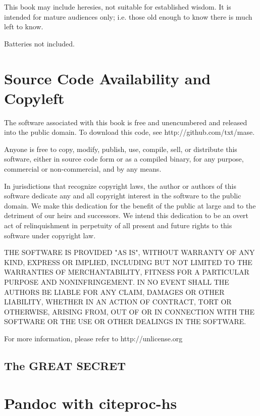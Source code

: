 \documentclass[9pt,twocolumn]{article}
\newcommand{\said}[1]{\citet*{#1}}
\begin{document}
This book may include heresies, not suitable for established wisdom. It is
intended for mature audiences only; i.e.  those
old enough to know there is much left to know. 

Batteries not included.

\section*{Source Code Availability and Copyleft}
The software associated with this book
is free and unencumbered and released into the public domain. To download this code, see http://github.com/txt/mase.

Anyone is free to copy, modify, publish, use, compile, sell, or
distribute this software, either in source code form or as a compiled
binary, for any purpose, commercial or non-commercial, and by any
means.

In jurisdictions that recognize copyright laws, the author or authors
of this software dedicate any and all copyright interest in the
software to the public domain. We make this dedication for the benefit
of the public at large and to the detriment of our heirs and
successors. We intend this dedication to be an overt act of
relinquishment in perpetuity of all present and future rights to this
software under copyright law.

THE SOFTWARE IS PROVIDED "AS IS", WITHOUT WARRANTY OF ANY KIND,
EXPRESS OR IMPLIED, INCLUDING BUT NOT LIMITED TO THE WARRANTIES OF
MERCHANTABILITY, FITNESS FOR A PARTICULAR PURPOSE AND NONINFRINGEMENT.
IN NO EVENT SHALL THE AUTHORS BE LIABLE FOR ANY CLAIM, DAMAGES OR
OTHER LIABILITY, WHETHER IN AN ACTION OF CONTRACT, TORT OR OTHERWISE,
ARISING FROM, OUT OF OR IN CONNECTION WITH THE SOFTWARE OR THE USE OR
OTHER DEALINGS IN THE SOFTWARE.

For more information, please refer to http://unlicense.org


\newpage




\newpage



\subsection*{The GREAT SECRET}



\section{Pandoc with citeproc-hs}\label{pandoc-with-citeproc-hs}

\said{item3}


\end{document}
